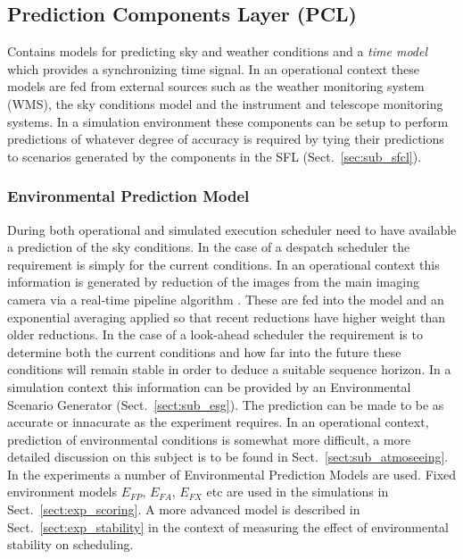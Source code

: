 \subsection{Prediction Components Layer (PCL)}
 Contains models for predicting sky and weather conditions and a \emph{time model} which provides a synchronizing time signal. %
 In an operational context these models are fed from external sources such as the weather monitoring system (WMS), the sky conditions model and the instrument and telescope monitoring systems. In a simulation environment these components can be setup to perform predictions of whatever degree of accuracy is required by tying their predictions to scenarios generated by the components in the SFL (Sect.~\ref{sec:sub_sfcl}).

\subsubsection{Environmental Prediction Model}
During both operational and simulated execution scheduler need to have available a prediction of the sky conditions. In the case of a despatch scheduler the requirement is simply for the current conditions. In an operational context this information is generated by reduction of the images from the main imaging camera via a real-time pipeline algorithm \cite{lt11pipelines}. These are fed into the model and an exponential averaging applied so that recent reductions have higher weight than older reductions. In the case of a look-ahead scheduler the requirement is to determine both the current conditions and how far into the future these conditions will remain stable in order to deduce a suitable sequence horizon. In a simulation context this information can be provided by an Environmental Scenario Generator (Sect.~\ref{sect:sub_esg}). The prediction can be made to be as accurate or innacurate as the experiment requires. In an operational context, prediction of environmental conditions is somewhat more difficult, a more detailed discussion on this subject is to be found in Sect.~\ref{sect:sub_atmoseeing}. In the experiments a number of Environmental Prediction Models are used. Fixed environment models $E_{FP}$, $E_{FA}$, $E_{FX}$     etc are used in the simulations in Sect.~\ref{sect:exp_scoring}. A more advanced model is described in Sect.~\ref{sect:exp_stability} in the context of measuring the effect of environmental stability on scheduling. 


